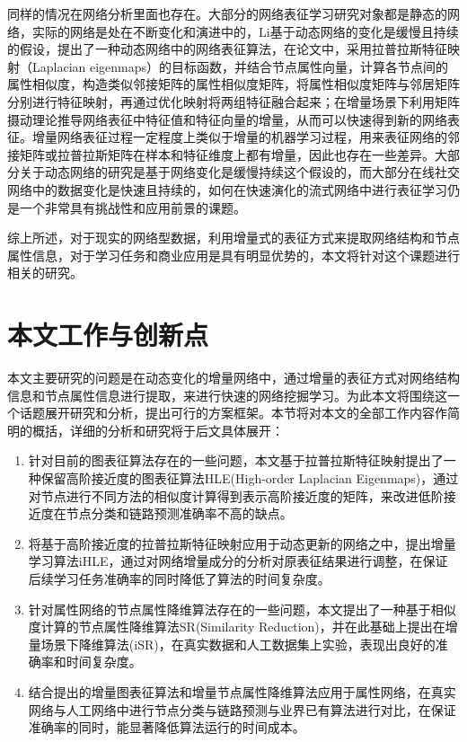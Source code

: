 同样的情况在网络分析里面也存在。大部分的网络表征学习研究对象都是静态的网络，实际的网络是处在不断变化和演进中的，Li\cite{li2017attributed}基于动态网络的变化是缓慢且持续的假设，提出了一种动态网络中的网络表征算法，在论文中，采用拉普拉斯特征映射（Laplacian eigenmaps）的目标函数，并结合节点属性向量，计算各节点间的属性相似度，构造类似邻接矩阵的属性相似度矩阵，将属性相似度矩阵与邻居矩阵分别进行特征映射，再通过优化映射将两组特征融合起来；在增量场景下利用矩阵摄动理论推导网络表征中特征值和特征向量的增量，从而可以快速得到新的网络表征。增量网络表征过程一定程度上类似于增量的机器学习过程，用来表征网络的邻接矩阵或拉普拉斯矩阵在样本和特征维度上都有增量，因此也存在一些差异。大部分关于动态网络的研究是基于网络变化是缓慢持续这个假设的，而大部分在线社交网络中的数据变化是快速且持续的，如何在快速演化的流式网络中进行表征学习仍是一个非常具有挑战性和应用前景的课题。

综上所述，对于现实的网络型数据，利用增量式的表征方式来提取网络结构和节点属性信息，对于学习任务和商业应用是具有明显优势的，本文将针对这个课题进行相关的研究。




\section{本文工作与创新点}
本文主要研究的问题是在动态变化的增量网络中，通过增量的表征方式对网络结构信息和节点属性信息进行提取，来进行快速的网络挖掘学习。为此本文将围绕这一个话题展开研究和分析，提出可行的方案框架。本节将对本文的全部工作内容作简明的概括，详细的分析和研究将于后文具体展开：


\begin{enumerate}
	\item 针对目前的图表征算法存在的一些问题，本文基于拉普拉斯特征映射提出了一种保留高阶接近度的图表征算法HLE(High-order Laplacian Eigenmaps)，通过对节点进行不同方法的相似度计算得到表示高阶接近度的矩阵，来改进低阶接近度在节点分类和链路预测准确率不高的缺点。
	\item 将基于高阶接近度的拉普拉斯特征映射应用于动态更新的网络之中，提出增量学习算法iHLE，通过对网络增量成分的分析对原表征结果进行调整，在保证后续学习任务准确率的同时降低了算法的时间复杂度。
	\item 针对属性网络的节点属性降维算法存在的一些问题，本文提出了一种基于相似度计算的节点属性降维算法SR(Similarity Reduction)，并在此基础上提出在增量场景下降维算法(iSR)，在真实数据和人工数据集上实验，表现出良好的准确率和时间复杂度。
	\item 结合提出的增量图表征算法和增量节点属性降维算法应用于属性网络，在真实网络与人工网络中进行节点分类与链路预测与业界已有算法进行对比，在保证准确率的同时，能显著降低算法运行的时间成本。
\end{enumerate}






